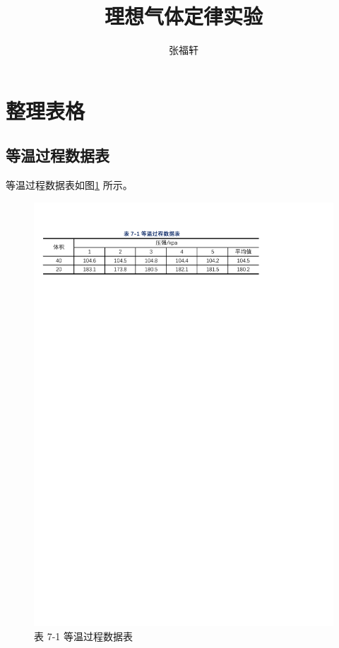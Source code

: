 \documentclass[12pt]{article}
\title{理想气体定律实验} %
\author{张福轩}
\begin{document}
\maketitle

\section{\normalfont 整理表格}

\subsection{\normalfont 等温过程数据表}

等温过程数据表如图\ref{fig:table_data1} 所示。

\begin{figure}[H] %
    \centering
    \includegraphics[width=\textwidth]{./figures/T7-1.pdf} 
    \caption{表 7-1 等温过程数据表}
    \label{fig:table_data1}
\end{figure}
\end{document}
